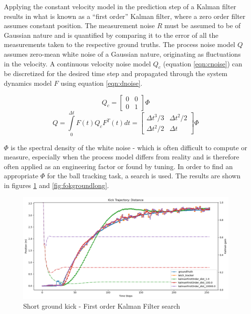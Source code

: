 \documentclass[a4paper,twoside,12pt]{report}
\begin{document}
Applying the constant velocity model in the prediction step of a Kalman filter results in what is known as a ``first order'' Kalman filter, where a zero order filter assumes constant position. The measurement noise $R$ must be assumed to be of Gaussian nature and is quantified by comparing it to the error of all the measurements taken to the respective ground truths. The process noise model $Q$ assumes zero-mean white noise of a Gaussian nature, originating as fluctuations in the velocity. A continuous velocity noise model $Q_c$ (equation \ref{eqn:cnoise}) can be discretized for the desired time step and propagated through the system dynamics model $F$ using equation \ref{eqn:dnoise}. \citep{kalmanpy}

\begin{equation} 
Q_c
=
\begin{bmatrix}
    0 & 0 \\
    0 & 1 
\end{bmatrix}
\Phi
\label{eqn:cnoise}
\end{equation}
\begin{equation} 
Q = \int\limits_0^{\Delta t} F(t)Q_cF^T(t)dt
=
\begin{bmatrix}
    \Delta t^3/3 & \Delta t^2/2 \\
    \Delta t^2/2 & \Delta t 
\end{bmatrix}
\Phi
\label{eqn:dnoise}
\end{equation}

$\Phi$ is the spectral density of the white noise - which is often difficult to compute or measure, especially when the process model differs from reality and is therefore often applied as an engineering factor or found by tuning. In order to find an appropriate $\Phi$ for the ball tracking task, a search is used. The results are shown in figures \ref{fig:fokgroundshort} and \ref{fig:fokgroundlong}.

\begin{figure}[h!]
\begin{center}
\includegraphics[width=12cm]{images/fok_ground_short.png}
\caption{Short ground kick - First order Kalman Filter search}
\label{fig:fokgroundshort}
\end{center}
\end{figure}
\end{document}
